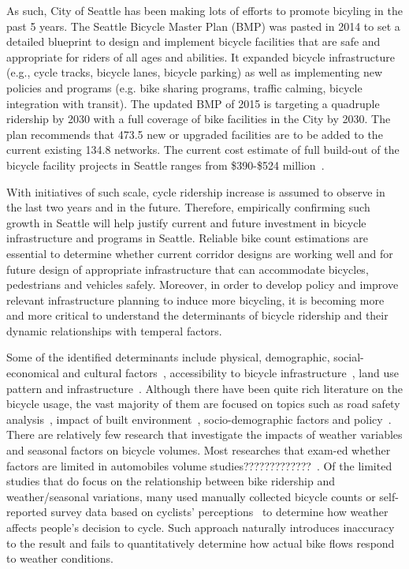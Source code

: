 \documentclass [11pt, proquest] {uwthesis}[2015/03/03]
\begin{document}
As such, City of Seattle has been making lots of efforts to promote bicyling in the past 5 years. The Seattle Bicycle Master Plan (BMP) was pasted in 2014 to set a detailed blueprint to design and implement bicycle facilities that are safe and appropriate for riders of all ages and abilities. It expanded bicycle infrastructure (e.g., cycle tracks, bicycle lanes, bicycle parking) as well as implementing new policies and programs (e.g. bike sharing programs, traffic calming, bicycle integration with transit). The updated BMP of 2015 is targeting a quadruple ridership by 2030 with a full coverage of bike facilities in the City by 2030. The plan recommends that 473.5 new or upgraded facilities are to be added to the current existing 134.8 networks. The current cost estimate of full build-out of the bicycle facility projects in Seattle ranges from \$390-\$524 million~\cite{SDOT_BMP15}.


With initiatives of such scale, cycle ridership increase is assumed to observe in the last two years and in the future. Therefore, empirically confirming such growth in Seattle will help justify current and future investment in bicycle infrastructure and programs in Seattle. Reliable bike count estimations are essential to determine whether current corridor designs are working well and for future design of appropriate infrastructure that can accommodate bicycles, pedestrians and vehicles safely. 
Moreover, in order to develop policy and improve relevant infrastructure planning to induce more bicycling, it is becoming more and more critical to understand the determinants of bicycle ridership and their dynamic relationships with temperal factors. 

Some of the identified determinants include physical, demographic, social-economical and cultural factors~\cite{Xing10,Pucher10,Krizek09}, accessibility to bicycle infrastructure~\cite{Voros07}, land use pattern and infrastructure~\cite{Dunlap15}. Although there have been quite rich literature on the bicycle usage, the vast majority of them are focused on topics such as road safety analysis~\cite{Kim07}, impact of built environment~\cite{Pucher10}, socio-demographic factors and policy~\cite{Garrard08,Xing10}. There are relatively few research that investigate the impacts of weather variables and seasonal factors on bicycle volumes. Most researches that exam-ed whether factors are limited in automobiles volume studies?????????????~\cite{Miranda-Moreno:2011aa,Rose:2011aa,Nosal:2014aa,Rose07}. Of the limited studies that do focus on the relationship between bike ridership and weather/seasonal variations, many used manually collected bicycle counts or self-reported survey data based on cyclists' perceptions~\cite{Nankervis99,Winters07,Richardson00,Richardson06} to determine how weather affects people's decision to cycle. Such approach naturally introduces inaccuracy to the result and fails to quantitatively determine how actual bike flows respond to weather conditions. 
\end{document}
